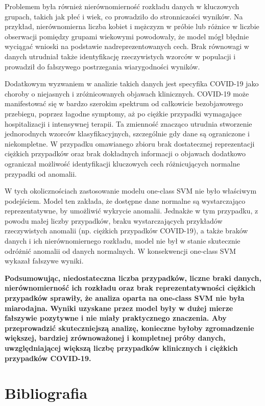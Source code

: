\documentclass[a4paper,fleqn]{cas-dc}
\begin{document}
Problemem była również nierównomierność rozkładu danych w kluczowych grupach, takich jak płeć i wiek, co prowadziło do stronniczości wyników. Na przykład, nierównomierna liczba kobiet i mężczyzn w próbie lub różnice w liczbie obserwacji pomiędzy grupami wiekowymi powodowały, że model mógł błędnie wyciągać wnioski na podstawie nadreprezentowanych cech. Brak równowagi w danych utrudniał także identyfikację rzeczywistych wzorców w populacji i prowadził do fałszywego postrzegania wiarygodności wyników.

Dodatkowym wyzwaniem w analizie takich danych jest specyfika COVID-19 jako choroby o niejasnych i zróżnicowanych objawach klinicznych. COVID-19 może manifestować się w bardzo szerokim spektrum od całkowicie bezobjawowego przebiegu, poprzez łagodne symptomy, aż po ciężkie przypadki wymagające hospitalizacji i intensywnej terapii. Ta zmienność znacząco utrudnia stworzenie jednorodnych wzorców klasyfikacyjnych, szczególnie gdy dane są ograniczone i niekompletne. W przypadku omawianego zbioru brak dostatecznej reprezentacji ciężkich przypadków oraz brak dokładnych informacji o objawach dodatkowo ograniczał możliwość identyfikacji kluczowych cech różnicujących normalne przypadki od anomalii.

W tych okolicznościach zastosowanie modelu one-class SVM nie było właściwym podejściem. Model ten zakłada, że dostępne dane normalne są wystarczająco reprezentatywne, by umożliwić wykrycie anomalii. Jednakże w tym przypadku, z powodu małej liczby przypadków, braku wystarczających przykładów rzeczywistych anomalii (np. ciężkich przypadków COVID-19), a także braków danych i ich nierównomiernego rozkładu, model nie był w stanie skutecznie odróżnić anomalii od danych normalnych. W konsekwencji one-class SVM wykazał fałszywe wyniki.

\textbf{Podsumowując, niedostateczna liczba przypadków, liczne braki danych, nierównomierność ich rozkładu oraz brak reprezentatywności ciężkich przypadków sprawiły, że analiza oparta na one-class SVM nie była miarodajna. Wyniki uzyskane przez model były w dużej mierze fałszywie pozytywne i nie miały praktycznego znaczenia. Aby przeprowadzić skuteczniejszą analizę, konieczne byłoby zgromadzenie większej, bardziej zrównoważonej i kompletnej próby danych, uwzględniającej większą liczbę przypadków klinicznych i ciężkich przypadków COVID-19.}

\section{Bibliografia}
\end{document}
